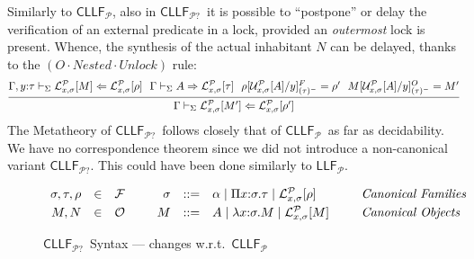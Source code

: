 \documentclass[submission,copyright,creativecommons]{eptcs}
\theoremstyle{plain}
\theoremstyle{definition}
\newcommand{\LLFP}  {\mbox{$\mathsf{LLF}_{\mathcal P}$}}
\newcommand{\CLLFP} {\mbox{$\mathsf{CLLF}_{\mathcal P}$}}
\newcommand{\CLLFPQ} {\mbox{$\mathsf{CLLF}_{\mathcal P?}$}}
\newcommand {\wrt}       {{\textrm{w}.\textrm{r}.\textrm{t}.}}
\newcommand {\Lock}   [4] {{\mathcal{L}}^{#1}_{#2, #3}[{#4}]} \newcommand {\LockC} [3] {{\mathcal{L}}^{#1}_{#2}      [{#3}]}
\newcommand {\VDASHS} {\vdash_\Sigma} \newcommand {\VDASHO} {\vdash_\Omega} \newcommand {\VDASHCBV} {\vdash_{\Sigma_{{CBV}}}} \newcommand {\VDASHSIMP} {\vdash_{\Sigma_{{Imp}}}} \newcommand {\VDASHSHOARE} {\vdash_{\Sigma_{{Hoare}}}} \newcommand {\VDASHSERASE} {\vdash_{\Sigma^\Erase}}    \newcommand {\VDASHEAL} {\vdash_{EAL}} \newcommand {\VDASHSEAL} {\vdash_{\Sigma_{{EAL}}}} \newcommand {\VDASHFP} {\vdash_{\sf FPST}}
\renewcommand {\P} {\mathcal{P}} \newcommand {\Q} {\mathcal{Q}}
\renewcommand {\L} {\mathcal{L}} \newcommand   {\C} {\mathcal{C}} \newcommand   {\T} {\mathcal{T}} \newcommand   {\U} {\mathcal{U}}
\newcommand{\up}[1]   {\vspace{-#1mm}}
\newcommand{\Erase} {{-\U\L}}
\begin{document}
Similarly to \CLLFP, also in \CLLFPQ\ it is possible to ``postpone''
or delay the verification of an external predicate in a lock, provided
an \emph{outermost} lock is present. Whence, the synthesis of the
actual inhabitant $N$ can be delayed, thanks to the
$(O{\cdot}Nested{\cdot}Unlock)$ rule:
$$
\infer{\Gamma \VDASHS {\Lock {\P} {x} {\sigma} {M'}}\Leftarrow
    {\Lock {\P} {x} {\sigma} {\rho'}}}
  {
\Gamma, y\of \tau \VDASHS \Lock \P {x} {\sigma} {M}\Leftarrow
     \Lock \P {x} {\sigma} {\rho}
     &\!\!
     \Gamma \VDASHS {A} \Rightarrow {\Lock \P {x} {\sigma}  {\tau}}
&\!\!
     \rho[ \Unlock {\P} {x} {\sigma}{A}/y]_{(\tau)^-}^{F}  =\rho'
     &\!\!
       M[\Unlock {\P} {x} {\sigma}{A}/y]_{(\tau)^-}^{O} = M'
}
$$
\noindent The Metatheory of \CLLFPQ\ follows closely that of \CLLFP\
as far as decidability. We have no correspondence theorem since we did
not introduce a non-canonical variant \CLLFPQ. This could have been
done similarly to \LLFP.

\begin{figure}
{\small
 \up{2}
  \begin{center}
    $
    \begin{array}{rcl@{\hspace{0.9cm}}rcl@{\hspace{0.9cm}}l}


\sigma, \tau, \rho & \in & \FF & \sigma & ::=
      & \alpha \mid {\Prod x {\sigma} {\tau}} \mid {\Lock {\P} {x} {\sigma} {\rho}} & \mbox{\em Canonical Families}
      \\[1mm]


M, N & \in & \OO & M & ::=
      & A \mid {\Abs x \sigma M} \mid {\Lock {\P} {x} {\sigma} {M}} & \mbox{\em Canonical Objects}
    \end{array}
    $
  \end{center}} \up{4}
  \caption{\CLLFPQ\ Syntax {--- changes \wrt\ \CLLFP}}
  \label{fig:cllfsyntaxQ}   \up{2}
\end{figure}
\end{document}
